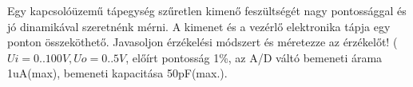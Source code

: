 \begin{example}

Egy kapcsolóüzemű tápegység szűretlen kimenő feszültségét nagy pontossággal és jó dinamikával szeretnénk mérni. A kimenet és a vezérlő elektronika tápja egy ponton összeköthető. Javasoljon érzékelési módszert és méretezze az érzékelőt! ($Ui=0..100V, Uo=0..5V$, előírt pontosság 1\%, az A/D váltó bemeneti árama 1uA(max), bemeneti kapacitása 50pF(max.).

\tcbline
\vspace{1mm}

\solution

\end{example}